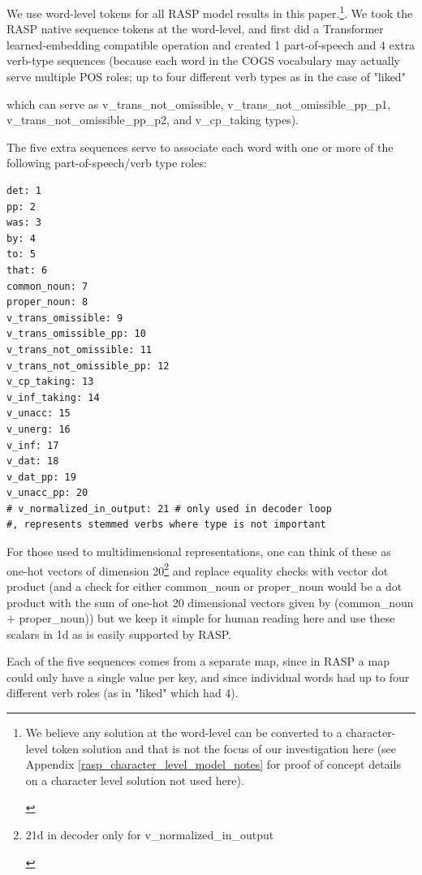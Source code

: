 \documentclass[11pt]{article}
\begin{document}
We use word-level tokens for all RASP model results in this paper.\footnote{\begin{footnotesize}We believe any solution at the word-level can be converted to a character-level token solution and that is not the focus of our investigation here (see Appendix \ref{rasp_character_level_model_notes} for proof of concept details on a character level solution not used here).\end{footnotesize}}. We took the RASP native sequence tokens at the word-level, and first did a Transformer learned-embedding compatible operation and created 1 part-of-speech and 4 extra verb-type sequences (because each word in the COGS vocabulary may actually serve multiple POS roles; up to four different verb types as in the case of "liked" 

which can serve as v\_trans\_not\_omissible, v\_trans\_not\_omissible\_pp\_p1, v\_trans\_not\_omissible\_pp\_p2, and v\_cp\_taking types). 

The five extra sequences serve to associate each word with one or more of the following part-of-speech/verb type roles:
\begin{tiny}
\begin{verbatim}
det: 1
pp: 2
was: 3
by: 4
to: 5
that: 6
common_noun: 7
proper_noun: 8
v_trans_omissible: 9
v_trans_omissible_pp: 10
v_trans_not_omissible: 11
v_trans_not_omissible_pp: 12
v_cp_taking: 13
v_inf_taking: 14
v_unacc: 15
v_unerg: 16
v_inf: 17
v_dat: 18
v_dat_pp: 19
v_unacc_pp: 20
# v_normalized_in_output: 21 # only used in decoder loop 
#, represents stemmed verbs where type is not important
\end{verbatim}
\end{tiny}

For those used to multidimensional representations, one can think of these as one-hot vectors of dimension 20\footnote{\begin{footnotesize}21d in decoder only for v\_normalized\_in\_output\end{footnotesize}} and replace equality checks with vector dot product (and a check for either common\_noun or proper\_noun would be a dot product with the sum of one-hot 20 dimensional vectors given by (common\_noun + proper\_noun)) but we keep it simple for human reading here and use these scalars in 1d as is easily supported by RASP.

Each of the five sequences comes from a separate map, since in RASP a map could only have a single value per key, and since individual words had up to four different verb roles (as in "liked" which had 4).
\end{document}
